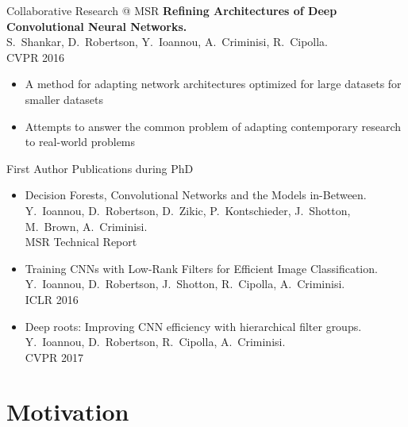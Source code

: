 \documentclass[t,xcolor=dvipsnames]{beamer}
\begin{document}
\begin{frame}{Collaborative Research @ MSR}
\textbf{Refining Architectures of Deep Convolutional Neural Networks.}\\{\footnotesize S.\ Shankar, D.\ Robertson, Y.\ Ioannou, A.\ Criminisi, R.\ Cipolla.\\CVPR 2016}
\begin{itemize}
    \item A method for adapting network architectures optimized for large datasets for smaller datasets
    \item Attempts to answer the common problem of adapting contemporary research to real-world problems
\end{itemize}
\end{frame}

\begin{frame}{First Author Publications during PhD}
\begin{itemize}
    \item Decision Forests, Convolutional Networks and the Models in-Between.\\{\footnotesize Y.\ Ioannou, D.\ Robertson, D.\ Zikic, P.\ Kontschieder, J.\ Shotton, M.\ Brown, A.\ Criminisi.\\MSR Technical Report} 
    \item Training CNNs with Low-Rank Filters for Efficient Image Classification.\\{\footnotesize Y.\ Ioannou, D.\ Robertson, J.\ Shotton, R.\ Cipolla, A.\ Criminisi. \\ICLR 2016}
    \item Deep roots: Improving CNN efficiency with hierarchical filter groups.\\{\footnotesize Y.\ Ioannou, D.\ Robertson, R.\ Cipolla, A.\ Criminisi.\\CVPR 2017}
    
\end{itemize}
\end{frame}
\section{Motivation}

\end{document}
